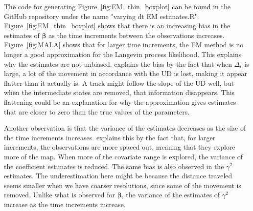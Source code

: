 The code for generating Figure~\ref{fig:EM_thin_boxplot} can be found in the GitHub repository under the name "varying dt EM estimates.R". Figure~\ref{fig:EM_thin_boxplot} shows that there is an increasing bias in the estimates of $\bm \beta$ as the time increments between the observations increases. Figure~\ref{fig:MALA} shows that for larger time increments, the EM method is no longer a good approximation for the Langevin process likelihood. This explains why the estimates are not unbiased. \parencite{michelot_langevin_2019} explains the bias by the fact that when $\Delta_t$ is large, a lot of the movement in accordance with the UD is lost, making it appear flatter than it actually is. A track might follow the slope of the UD well, but when the intermediate states are removed, that information disappears. This flattening could be an explanation for why the approximation gives estimates that are closer to zero than the true values of the parameters. 


Another observation is that the variance of the estimates decreases as the size of the time increments increases. \parencite{michelot_langevin_2019} explains this by the fact that, for larger increments, the observations are more spaced out, meaning that they explore more of the map. When more of the covariate range is explored, the variance of the coefficient estimates is reduced. The same bias is also observed in the $\gamma^2$ estimates. The underestimation here might be because the distance traveled seems smaller when we have coarser resolutions, since some of the movement is removed. Unlike what is observed for $\bm \beta$, the variance of the estimates of $\gamma^2$ increase as the time increments increase.

